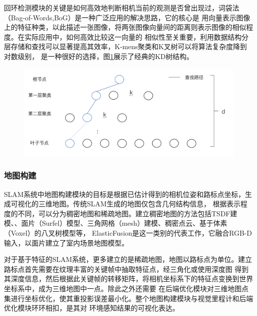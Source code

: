 回环检测模块的关键是如何高效地判断相机当前的观测是否曾出现过，词袋法（Bag-of-Words,BoG）是一种广泛应用的解决思路，它的核心是
用向量表示图像上的特征种类，以此描述一张图像，将两张图像向量间的距离则表示图像的相似程度。在实际应用中，如何高效比较这一向量的
相似性至关重要，利用数据结构分层存储和查找可以显著提高其效率，K-mens聚类和K叉树可以将算法复杂度降到对数级别，
是一种很好的选择，图\ref{fig:kdTree}展示了经典的KD树结构。
\begin{figure}[!htbp]
    \centering
    \includegraphics[width=\textwidth]{Img/2-kdTree.png}
    \label{fig:kdTree}
\end{figure}
\subsubsection{地图构建}
SLAM系统中地图构建模块的目标是根据已估计得到的相机位姿和路标点坐标，生成可视化的三维地图。传统SLAM生成的地图仅包含几何结构信息，
根据表示程度的不同，可以分为稠密地图和稀疏地图。建立稠密地图的方法包括TSDF建模、、面片（Surfel）模型、三角网格（mesh）建模、稠密点云、基于体素（Voxel）的八叉树模型等，
ElasticFusion是这一类别的代表工作，它融合RGB-D输入，以面片建立了室内场景地图模型。

对于基于特征的SLAM系统，更多建立的是稀疏地图，地图以路标点为单位。建立路标点首先需要在纹理丰富的关键帧中抽取特征点，经三角化或使用深度图
得到其深度信息，然后根据此关键帧的转移矩阵，将相机坐标系下的特征点变换到世界坐标系中，成为三维地图中一点。除此之外还需要
在后端优化模块对三维地图点集进行坐标优化，使其重投影误差最小化。整个地图构建模块与视觉里程计和后端优化模块环环相扣，是其对
环境感知结果的可视化表达。

